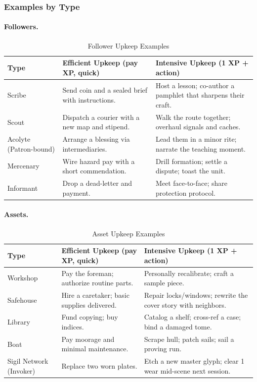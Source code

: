 \subsubsection{Examples by Type}\label{subsec:upkeep_examples}

\paragraph{Followers.}
\begin{longtable}{p{2.5cm} p{5cm} p{5cm}}
\caption{Follower Upkeep Examples}\label{tab:follower_upkeep}\\
\toprule
\textbf{Type} & \textbf{Efficient Upkeep (pay XP, quick)} & \textbf{Intensive Upkeep (1 XP + action)} \\
\midrule
Scribe & Send coin and a sealed brief with instructions. & Host a lesson; co-author a pamphlet that sharpens their craft. \\
Scout & Dispatch a courier with a new map and stipend. & Walk the route together; overhaul signals and caches. \\
Acolyte (Patron-bound) & Arrange a blessing via intermediaries. & Lead them in a minor rite; narrate the teaching moment. \\
Mercenary & Wire hazard pay with a short commendation. & Drill formation; settle a dispute; toast the unit. \\
Informant & Drop a dead-letter and payment. & Meet face-to-face; share protection protocol. \\
\bottomrule
\end{longtable}

\paragraph{Assets.}
\begin{longtable}{p{2.5cm} p{5cm} p{5cm}}
\caption{Asset Upkeep Examples}\label{tab:asset_upkeep}\\
\toprule
\textbf{Type} & \textbf{Efficient Upkeep (pay XP, quick)} & \textbf{Intensive Upkeep (1 XP + action)} \\
\midrule
Workshop & Pay the foreman; authorize routine parts. & Personally recalibrate; craft a sample piece. \\
Safehouse & Hire a caretaker; basic supplies delivered. & Repair locks/windows; rewrite the cover story with neighbors. \\
Library & Fund copying; buy indices. & Catalog a shelf; cross-ref a case; bind a damaged tome. \\
Boat & Pay moorage and minimal maintenance. & Scrape hull; patch sails; sail a proving run. \\
Sigil Network (Invoker) & Replace two worn plates. & Etch a new master glyph; clear 1 wear mid-scene next session. \\
\bottomrule
\end{longtable}

